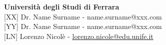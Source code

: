 \def\vhhistoryname{Revisioni}%
\def\vhversionname{Revisione}%
\def\vhdatename{Data}%
\def\vhauthorname{Autori}%
\def\vhchangename{Descrizione}%

\begin{versionhistory}
\end{versionhistory}

\vspace{3cm}

\noindent\large\textbf{Università degli Studi di Ferrara}\\

\noindent\normalsize [XX] Dr. Name Surname - name.surname@xxx.com\\
\noindent\normalsize [YY] Dr. Name Surname - name.surname@xxx.com\\
\noindent\normalsize [LN] Lorenzo Nicolè - \href{mailto:lorenzo.nicole@edu.unife.it}{lorenzo.nicole@edu.unife.it}